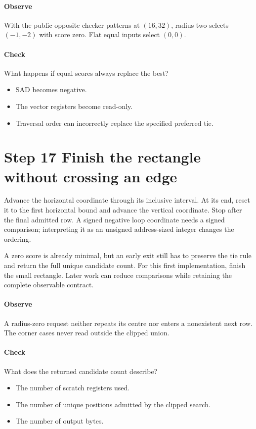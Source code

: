 \paragraph{Observe} With the public opposite checker patterns at $(16,32)$,
radius two selects $(-1,-2)$ with score zero. Flat equal inputs select $(0,0)$.
\paragraph{Check} What happens if equal scores always replace the best?
\begin{itemize}
  \item[A.] SAD becomes negative.
  \item[B.] The vector registers become read-only.
  \item[C.] Traversal order can incorrectly replace the specified preferred tie.
\end{itemize}

\section{Step 17 Finish the rectangle without crossing an edge}\label{h263-motion-s07}
Advance the horizontal coordinate through its inclusive interval. At its end,
reset it to the first horizontal bound and advance the vertical coordinate.
Stop after the final admitted row. A signed negative loop coordinate needs a
signed comparison; interpreting it as an unsigned address-sized integer changes
the ordering.

A zero score is already minimal, but an early exit still has to preserve the
tie rule and return the full unique candidate count. For this first implementation,
finish the small rectangle. Later work can reduce comparisons while retaining
the complete observable contract.

\paragraph{Observe} A radius-zero request neither repeats its centre nor enters
a nonexistent next row. The corner cases never read outside the clipped union.
\paragraph{Check} What does the returned candidate count describe?
\begin{itemize}
  \item[A.] The number of scratch registers used.
  \item[B.] The number of unique positions admitted by the clipped search.
  \item[C.] The number of output bytes.
\end{itemize}

